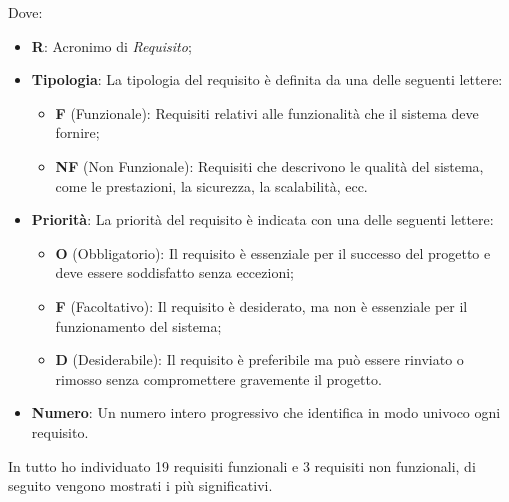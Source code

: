 Dove:
\begin{itemize}
    \item \textbf{R}: Acronimo di \textit{Requisito};
    \item \textbf{Tipologia}: La tipologia del requisito è definita da una delle seguenti lettere:
        \begin{itemize}
            \item \textbf{F} (Funzionale): Requisiti relativi alle funzionalità che il sistema deve fornire;
            \item \textbf{NF} (Non Funzionale): Requisiti che descrivono le qualità del sistema, come le prestazioni, la sicurezza, la scalabilità, ecc.
        \end{itemize}
    \item \textbf{Priorità}: La priorità del requisito è indicata con una delle seguenti lettere:
        \begin{itemize}
            \item \textbf{O} (Obbligatorio): Il requisito è essenziale per il successo del progetto e deve essere soddisfatto senza eccezioni;
            \item \textbf{F} (Facoltativo): Il requisito è desiderato, ma non è essenziale per il funzionamento del sistema;
            \item \textbf{D} (Desiderabile): Il requisito è preferibile ma può essere rinviato o rimosso senza compromettere gravemente il progetto.
        \end{itemize}
    \item \textbf{Numero}: Un numero intero progressivo che identifica in modo univoco ogni requisito.
\end{itemize}

\noindent In tutto ho individuato 19 requisiti funzionali e 3 requisiti non funzionali, di seguito vengono mostrati i più significativi.
